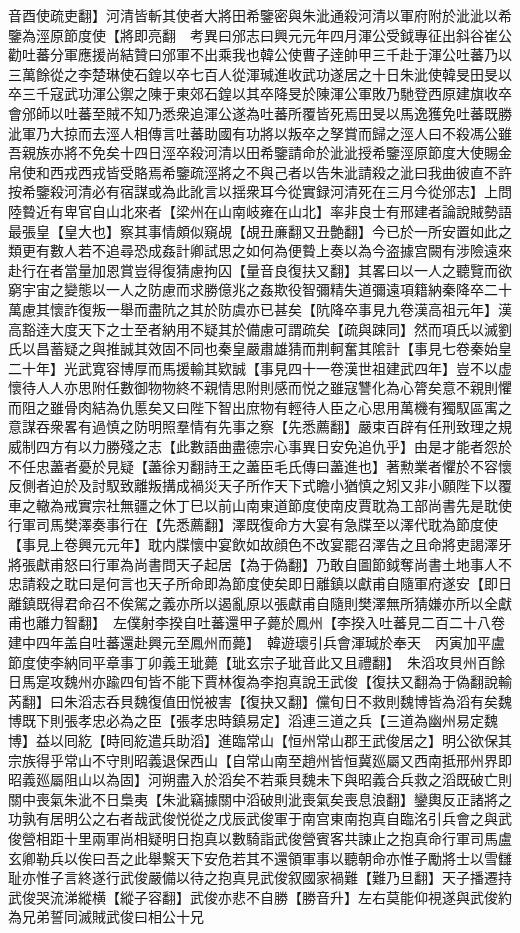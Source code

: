 音酉使疏吏翻】河清皆斬其使者大將田希鑒密與朱泚通殺河清以軍府附於泚泚以希鑒為涇原節度使【將即亮翻　考異曰邠志曰興元元年四月渾公受鉞專征出斜谷崔公勸吐蕃分軍應援尚結贊曰邠軍不出乘我也韓公使曹子逹帥甲三千赴于渾公吐蕃乃以三萬餘從之李楚琳使石鍠以卒七百人從渾瑊進收武功遂居之十日朱泚使韓旻田旻以卒三千寇武功渾公禦之陳于東郊石鍠以其卒降旻於陳渾公軍敗乃馳登西原建旗收卒會邠師以吐蕃至賊不知乃悉衆追渾公遂為吐蕃所覆皆死焉田旻以馬逸獲免吐蕃既勝泚軍乃大掠而去涇人相傳言吐蕃助國有功將以叛卒之孥賞而歸之涇人曰不殺馮公雖吾親族亦將不免矣十四日涇卒殺河清以田希鑒請命於泚泚授希鑒涇原節度大使賜金帛使和西戎西戎皆受賂焉希鑒疏涇將之不與己者以告朱泚請殺之泚曰我曲彼直不許按希鑒殺河清必有宿謀或為此訛言以揺衆耳今從實録河清死在三月今從邠志】上問陸䞇近有卑官自山北來者【梁州在山南岐雍在山北】率非良士有邢建者論說賊勢語最張皇【皇大也】察其事情頗似窺覘【覘丑亷翻又丑艶翻】今已於一所安置如此之類更有數人若不追尋恐成姦計卿試思之如何為便䞇上奏以為今盗據宫闕有涉險遠來赴行在者當量加恩賞豈得復猜慮拘囚【量音良復扶又翻】其畧曰以一人之聽覽而欲窮宇宙之變態以一人之防慮而求勝億兆之姦欺役智彌精失道彌遠項籍納秦降卒二十萬慮其懷詐復叛一舉而盡阬之其於防虞亦已甚矣【阬降卒事見九卷漢高祖元年】漢高豁逹大度天下之士至者納用不疑其於備慮可謂疏矣【疏與踈同】然而項氏以滅劉氏以昌蓄疑之與推誠其效固不同也秦皇嚴肅雄猜而荆軻奮其隂計【事見七卷秦始皇二十年】光武寛容博厚而馬援輸其欵誠【事見四十一卷漢世祖建武四年】豈不以虚懷待人人亦思附任數御物物終不親情思附則感而悦之雖寇讐化為心膂矣意不親則懼而阻之雖骨肉結為仇慝矣又曰陛下智出庶物有輕待人臣之心思用萬機有獨馭區㝢之意謀吞衆畧有過慎之防明照羣情有先事之察【先悉薦翻】嚴束百辟有任刑致理之規威制四方有以力勝殘之志【此數語曲盡德宗心事異日安免追仇乎】由是才能者怨於不任忠藎者憂於見疑【藎徐刃翻詩王之藎臣毛氏傳曰藎進也】著勲業者懼於不容懷反側者迫於及討馭致離叛搆成禍災天子所作天下式瞻小猶慎之矧又非小願陛下以覆車之轍為戒實宗社無疆之休丁巳以前山南東道節度使南皮賈耽為工部尚書先是耽使行軍司馬樊澤奏事行在【先悉薦翻】澤既復命方大宴有急牒至以澤代耽為節度使【事見上卷興元元年】耽内牒懷中宴飲如故顔色不改宴罷召澤告之且命將吏謁澤牙將張獻甫怒曰行軍為尚書問天子起居【為于偽翻】乃敢自圖節鉞奪尚書土地事人不忠請殺之耽曰是何言也天子所命即為節度使矣即日離鎮以獻甫自隨軍府遂安【即日離鎮既得君命召不俟駕之義亦所以遏亂原以張獻甫自隨則樊澤無所猜嫌亦所以全獻甫也離力智翻】　左僕射李揆自吐蕃還甲子薨於鳳州【李揆入吐蕃見二百二十八卷建中四年盖自吐蕃還赴興元至鳳州而薨】　韓遊瓌引兵會渾瑊於奉天　丙寅加平盧節度使李納同平章事丁卯義王玼薨【玼玄宗子玼音此又且禮翻】　朱滔攻貝州百餘日馬寔攻魏州亦踰四旬皆不能下賈林復為李抱真說王武俊【復扶又翻為于偽翻說輸芮翻】曰朱滔志呑貝魏復值田悦被害【復抉又翻】儻旬日不救則魏博皆為滔有矣魏博既下則張孝忠必為之臣【張孝忠時鎮易定】滔連三道之兵【三道為幽州易定魏博】益以囘紇【時囘紇遣兵助滔】進臨常山【恒州常山郡王武俊居之】明公欲保其宗族得乎常山不守則昭義退保西山【自常山南至趙州皆恒冀廵屬又西南抵邢州界即昭義廵屬阻山以為固】河朔盡入於滔矣不若乘貝魏未下與昭義合兵救之滔既破亡則關中喪氣朱泚不日梟夷【朱泚竊據關中滔破則泚喪氣矣喪息浪翻】鑾輿反正諸將之功孰有居明公之右者哉武俊悦從之戊辰武俊軍于南宫東南抱真自臨洺引兵會之與武俊營相距十里兩軍尚相疑明日抱真以數騎詣武俊營賓客共諫止之抱真命行軍司馬盧玄卿勒兵以俟曰吾之此舉繫天下安危若其不還領軍事以聽朝命亦惟子勵將士以雪讎耻亦惟子言終遂行武俊嚴備以待之抱真見武俊叙國家禍難【難乃旦翻】天子播遷持武俊哭流涕縱横【縱子容翻】武俊亦悲不自勝【勝音升】左右莫能仰視遂與武俊約為兄弟誓同滅賊武俊曰相公十兄